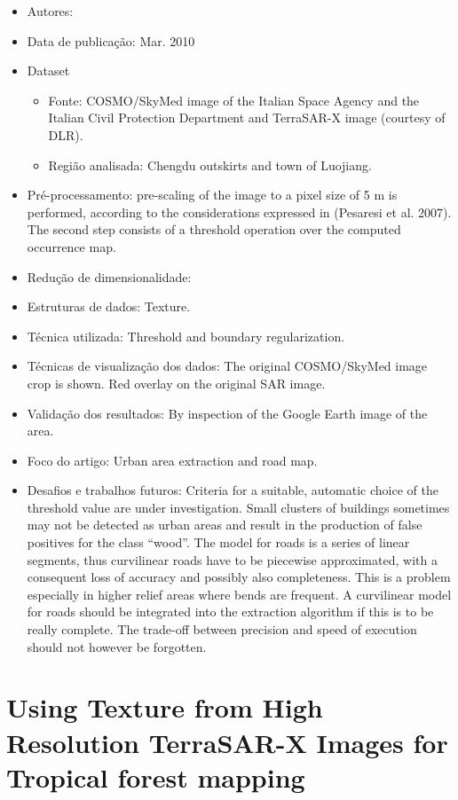 \documentclass[paper=a4, fontsize=11pt]{scrartcl}
\begin{document}
\begin{itemize}
    \item Autores:~\cite{dell2010rapid}
    \item Data de publicação: Mar. 2010
    \item Dataset
    \begin{itemize}
        \item Fonte: COSMO/SkyMed image of the Italian Space Agency and the Italian Civil Protection Department and TerraSAR-X image (courtesy of DLR).
        \item Região analisada: Chengdu outskirts and town of Luojiang.
    \end{itemize}
    \item Pré-processamento: pre-scaling of the image to a pixel size of 5 m is performed, according to the considerations expressed in (Pesaresi et al. 2007). The second step consists of a threshold operation over the computed occurrence map.
    \item Redução de dimensionalidade:
    \item Estruturas de dados: Texture.
    \item Técnica utilizada: Threshold and boundary regularization.
    \item Técnicas de visualização dos dados: The original COSMO/SkyMed image crop is shown. Red overlay on the original SAR image.
    \item Validação dos resultados: By inspection of the Google Earth image of the area.
    \item Foco do artigo: Urban area extraction and road map.
    \item Desafios e trabalhos futuros: Criteria for a suitable, automatic choice of the threshold value are under investigation. Small clusters of buildings sometimes may not be detected as urban areas and result in the production of false positives for the class “wood”. The model for roads is a series of linear segments, thus curvilinear roads have to be piecewise approximated, with a consequent loss of accuracy and possibly also completeness. This is a problem especially in higher relief areas where bends are frequent. A curvilinear model for roads should be integrated into the extraction algorithm if this is to be really complete. The trade-off between precision and speed of execution should not however be forgotten.
\end{itemize}

\newpage

\section*{Using Texture from High Resolution TerraSAR-X Images for Tropical forest mapping}
\end{document}
